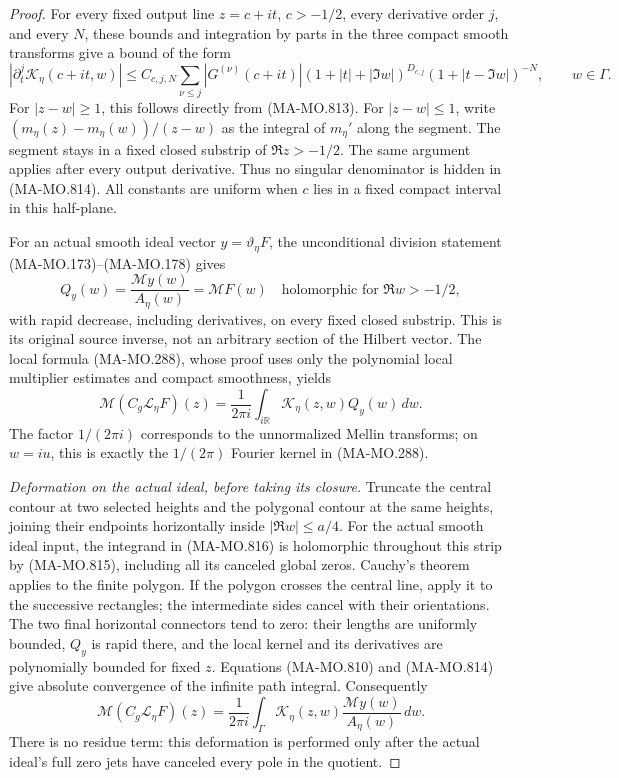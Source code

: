 \begin{proof}
For every fixed output line \(z=c+it\), \(c>-1/2\),
every derivative order \(j\), and every \(N\), these
bounds and integration by parts in the three compact
smooth transforms give a bound of the form
\[
 \left|\partial_t^j\mathcal K_\eta(c+it,w)\right|
 \le C_{c,j,N}
   \sum_{\nu\le j}|G^{(\nu)}(c+it)|
       (1+|t|+|\Im w|)^{D_{c,j}}
       (1+|t-\Im w|)^{-N},
       \qquad w\in\Gamma.
 \tag{MA-MO.814}
\]
For \(|z-w|\ge1\), this follows directly from
(MA-MO.813). For \(|z-w|\le1\), write
\((m_\eta(z)-m_\eta(w))/(z-w)\) as the integral of
\(m_\eta'\) along the segment. The segment stays in a
fixed closed substrip of \(\Re z>-1/2\). The same
argument applies after every output derivative.
Thus no singular denominator is hidden in (MA-MO.814).
All constants are uniform when \(c\) lies in a fixed
compact interval in this half-plane.

For an actual smooth ideal vector \(y=\vartheta_\eta F\),
the unconditional division statement (MA-MO.173)--(MA-MO.178)
gives
\[
 Q_y(w)=\frac{\mathcal My(w)}{A_\eta(w)}
             =\mathcal MF(w)
       \quad\text{holomorphic for }\Re w>-1/2,
 \tag{MA-MO.815}
\]
with rapid decrease, including derivatives, on every
fixed closed substrip. This is its original source
inverse, not an arbitrary section of the Hilbert vector.
The local formula (MA-MO.288), whose proof uses only
the polynomial local multiplier estimates and compact
smoothness, yields
\[
 \mathcal M(C_g\mathcal L_\eta F)(z)
       =\frac1{2\pi i}\int_{i\mathbb R}
                     \mathcal K_\eta(z,w)Q_y(w)\,dw .
 \tag{MA-MO.816}
\]
The factor \(1/(2\pi i)\) corresponds to the
unnormalized Mellin transforms; on \(w=iu\), this
is exactly the \(1/(2\pi)\) Fourier kernel in
(MA-MO.288).

\emph{Deformation on the actual ideal, before taking its closure.}
Truncate the central contour at two selected heights
and the polygonal contour at the same heights, joining
their endpoints horizontally inside \(|\Re w|\le a/4\).
For the actual smooth ideal input, the integrand in
(MA-MO.816) is holomorphic throughout this strip by
(MA-MO.815), including all its canceled global zeros.
Cauchy's theorem applies to the finite polygon. If
the polygon crosses the central line, apply it to
the successive rectangles; the intermediate sides
cancel with their orientations.
The two final horizontal connectors tend to zero:
their lengths are uniformly bounded, \(Q_y\) is
rapid there, and the local kernel and its derivatives
are polynomially bounded for fixed \(z\).
Equations (MA-MO.810) and (MA-MO.814) give absolute
convergence of the infinite path integral. Consequently
\[
 \mathcal M(C_g\mathcal L_\eta F)(z)
       =\frac1{2\pi i}\int_{\Gamma}
          \mathcal K_\eta(z,w)
               \frac{\mathcal My(w)}{A_\eta(w)}\,dw .
 \tag{MA-MO.817}
\]
There is no residue term: this deformation is performed
only after the actual ideal's full zero jets have
canceled every pole in the quotient.


\end{proof}
